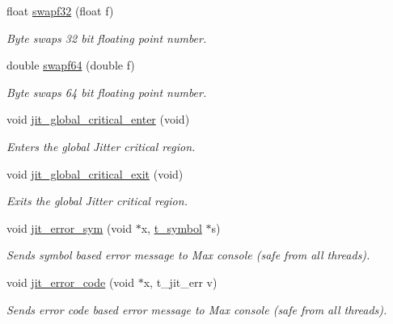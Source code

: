 \begin{DoxyCompactItemize}
\item 
float \hyperlink{group__utilitymod_ga830cf9c4a9f6e87767dabf29a3610181}{swapf32} (float f)
\begin{DoxyCompactList}\small\item\em Byte swaps 32 bit floating point number. \item\end{DoxyCompactList}\item 
double \hyperlink{group__utilitymod_ga8eaccf938b9088a33cf4b794821ce270}{swapf64} (double f)
\begin{DoxyCompactList}\small\item\em Byte swaps 64 bit floating point number. \item\end{DoxyCompactList}\item 
void \hyperlink{group__utilitymod_gace84dbb97cc894c7af080f676de34781}{jit\_\-global\_\-critical\_\-enter} (void)
\begin{DoxyCompactList}\small\item\em Enters the global Jitter critical region. \item\end{DoxyCompactList}\item 
void \hyperlink{group__utilitymod_gaed36b7cd30e3ac8859cf8808c199b6de}{jit\_\-global\_\-critical\_\-exit} (void)
\begin{DoxyCompactList}\small\item\em Exits the global Jitter critical region. \item\end{DoxyCompactList}\item 
void \hyperlink{group__utilitymod_gae0572119ae652a87ae84f181d439d0e9}{jit\_\-error\_\-sym} (void $\ast$x, \hyperlink{structt__symbol}{t\_\-symbol} $\ast$s)
\begin{DoxyCompactList}\small\item\em Sends symbol based error message to Max console (safe from all threads). \item\end{DoxyCompactList}\item 
void \hyperlink{group__utilitymod_ga65b95cf6d8f87c67d0333a6baf17aa63}{jit\_\-error\_\-code} (void $\ast$x, t\_\-jit\_\-err v)
\begin{DoxyCompactList}\small\item\em Sends error code based error message to Max console (safe from all threads). \item\end{DoxyCompactList}\item 

\end{DoxyCompactItemize}
